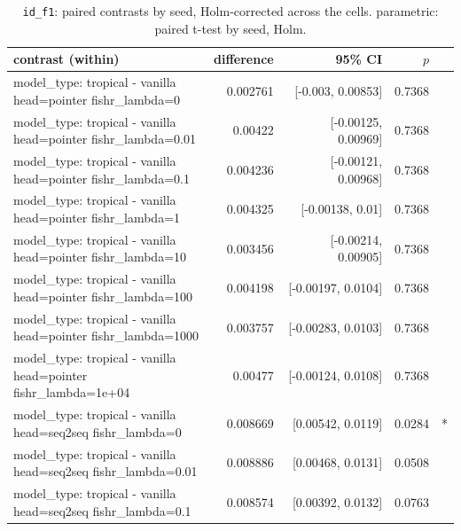 \documentclass[10pt]{article}
\makeatletter
\newcommand{\stackcell}[1]{\begin{tabular}[t]{@{}l@{}}#1\end{tabular}}
\makeatother
\begin{document}
{\small
\begin{longtable}{lrrrl}
\caption{\texttt{id\_f1}: paired contrasts by seed, Holm-corrected across the cells. parametric: paired t-test by seed, Holm.}\label{tab:paired-id_f1}\\
\toprule
contrast (within) & difference & 95\% CI & $p$ & \\
\midrule
\endhead
\stackcell{model\_type: tropical - vanilla\\\footnotesize head=pointer fishr\_lambda=0 } & 0.002761 & [-0.003, 0.00853] & 0.7368 & \\
\stackcell{model\_type: tropical - vanilla\\\footnotesize head=pointer fishr\_lambda=0.01 } & 0.00422 & [-0.00125, 0.00969] & 0.7368 & \\
\stackcell{model\_type: tropical - vanilla\\\footnotesize head=pointer fishr\_lambda=0.1 } & 0.004236 & [-0.00121, 0.00968] & 0.7368 & \\
\stackcell{model\_type: tropical - vanilla\\\footnotesize head=pointer fishr\_lambda=1 } & 0.004325 & [-0.00138, 0.01] & 0.7368 & \\
\stackcell{model\_type: tropical - vanilla\\\footnotesize head=pointer fishr\_lambda=10 } & 0.003456 & [-0.00214, 0.00905] & 0.7368 & \\
\stackcell{model\_type: tropical - vanilla\\\footnotesize head=pointer fishr\_lambda=100 } & 0.004198 & [-0.00197, 0.0104] & 0.7368 & \\
\stackcell{model\_type: tropical - vanilla\\\footnotesize head=pointer fishr\_lambda=1000 } & 0.003757 & [-0.00283, 0.0103] & 0.7368 & \\
\stackcell{model\_type: tropical - vanilla\\\footnotesize head=pointer fishr\_lambda=1e+04 } & 0.00477 & [-0.00124, 0.0108] & 0.7368 & \\
\stackcell{model\_type: tropical - vanilla\\\footnotesize head=seq2seq fishr\_lambda=0 } & 0.008669 & [0.00542, 0.0119] & 0.0284 & *\\
\stackcell{model\_type: tropical - vanilla\\\footnotesize head=seq2seq fishr\_lambda=0.01 } & 0.008886 & [0.00468, 0.0131] & 0.0508 & \\
\stackcell{model\_type: tropical - vanilla\\\footnotesize head=seq2seq fishr\_lambda=0.1 } & 0.008574 & [0.00392, 0.0132] & 0.0763 & \\

\end{longtable}}
\end{document}
